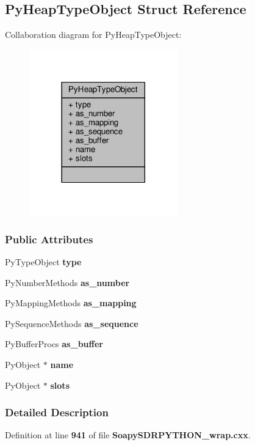 \subsection{Py\+Heap\+Type\+Object Struct Reference}
\label{structPyHeapTypeObject}


Collaboration diagram for Py\+Heap\+Type\+Object\+:
\nopagebreak
\begin{figure}[H]
\begin{center}
\leavevmode
\includegraphics[width=182pt]{d4/d97/structPyHeapTypeObject__coll__graph}
\end{center}
\end{figure}
\subsubsection*{Public Attributes}
\begin{DoxyCompactItemize}
\item 
Py\+Type\+Object {\bf type}
\item 
Py\+Number\+Methods {\bf as\+\_\+number}
\item 
Py\+Mapping\+Methods {\bf as\+\_\+mapping}
\item 
Py\+Sequence\+Methods {\bf as\+\_\+sequence}
\item 
Py\+Buffer\+Procs {\bf as\+\_\+buffer}
\item 
Py\+Object $\ast$ {\bf name}
\item 
Py\+Object $\ast$ {\bf slots}
\end{DoxyCompactItemize}


\subsubsection{Detailed Description}


Definition at line {\bf 941} of file {\bf Soapy\+S\+D\+R\+P\+Y\+T\+H\+O\+N\+\_\+wrap.\+cxx}.



